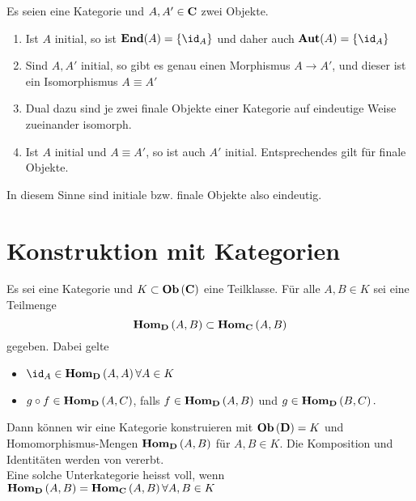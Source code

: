 \documentclass{article}
\begin{document}
\begin{bsp}[Fundamentalgruppoid]
\begin{lem}[Eindeutigkeit]
 \cite[Lemma 2.5.5]{Bra}
	Es seien \CatC eine Kategorie und 
	\(A , A' \in \mathbf{C} \) zwei Objekte.
	\begin{enumerate}
		\item Ist \(A \) initial, so ist \( \End(A)= \left\lbrace \id_A \right\rbrace \) und daher auch \( \Aut(A)=\left\lbrace \id_A \right\rbrace \)
		\item Sind \( A,A' \) initial, so gibt es genau einen Morphismus \( A \to A' \), und dieser ist ein Isomorphismus \( A \equiv A' \) 
		\item Dual dazu sind je zwei finale Objekte einer Kategorie auf eindeutige Weise zueinander isomorph.
		\item Ist \( A \) initial und \( A \equiv A' \), so ist auch \( A' \) initial. Entsprechendes gilt f\"ur finale Objekte.
	\end{enumerate}
	In diesem Sinne sind initiale bzw. finale Objekte also eindeutig.
\end{lem}

\section{Konstruktion mit Kategorien}

\begin{defi}[Unterkategorie] {\cite[Definition 2.6.1]{Bra}} 
Es sei \CatC eine Kategorie und \( K \subset  \mathbf{Ob} \left(\mathbf{C}\right) \) eine Teilklasse. F\"ur alle \( A,B \in K \) sei eine Teilmenge
\[
	 \mathbf{Hom } _\mathbf{D} \left( A, B \right) \subset  \mathbf{Hom } _\mathbf{C} \left( A, B \right)
\]
gegeben. Dabei gelte
\begin{itemize}
	\item \( \id_A \in \Hom_\CatD \left( A, A \right) \forall A \in K \)
	\item \( g \circ f \in   \mathbf{Hom } _\mathbf{D} \left( A,C \right) \), falls \( f \in  \mathbf{Hom } _\mathbf{D} \left( A, B \right) \) und  \( g \in  \mathbf{Hom } _\mathbf{D} \left( B , C \right) .\)
\end{itemize}
Dann k\"onnen wir eine Kategorie \CatD konstruieren mit \(  \mathbf{Ob}  \left( \mathbf{D} \right) = K \) und Homomorphismus-Mengen \(  \mathbf{Hom } _\mathbf{D} \left(A,B \right) \) f\"ur \( A,B \in K \). Die Komposition und Identit\"aten werden von \CatC vererbt.
\\
Eine solche Unterkategorie heisst voll, wenn \(  \mathbf{Hom } _\mathbf{D} \left( A,B \right) =  \mathbf{Hom } _\mathbf{C} \left(A,B \right) \forall A,B \in K \)
 

\end{defi}
\end{bsp}
\end{document}
